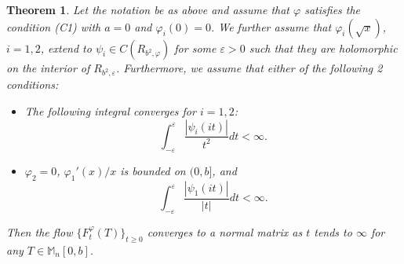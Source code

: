 \documentclass[10pt,a4paper]{amsart}
\newtheorem{theorem}{Theorem}
\newcommand{\M}{\mathbb{M}}
\begin{document}
\begin{theorem}\label{holomorphic} Let the notation be as above and assume that $\varphi$ satisfies the condition (C1) 
with $a=0$ and $\varphi_i(0)=0$. 
We further assume that $\varphi_i(\sqrt{x})$, $i=1,2$, 
extend to $\psi_i\in C(R_{b^2,\varphi})$ for some $\varepsilon>0$ such that they are holomorphic 
on the interior of $R_{b^2,\varepsilon}$.  
Furthermore, we assume that either of the following 2 conditions: 
\begin{itemize}
\item[$(1)$] The following integral converges for $i=1,2$: 
\[\int_{-\varepsilon}^{\varepsilon}\frac{|\psi_i(it)|}{t^2}dt<\infty.\] 
\item[$(2)$] $\varphi_2=0$, $\varphi_1'(x)/x$ is bounded on $(0,b]$, and 
\[\int_{-\varepsilon}^{\varepsilon}\frac{|\psi_1(it)|}{|t|}dt<\infty.\] 
\end{itemize}
Then the flow $\{F^\varphi_t(T)\}_{t\geq 0}$ converges to a normal matrix 
as $t$ tends to $\infty$ for any $T\in \M_n[0,b]$.  
\end{theorem}
\end{document}
